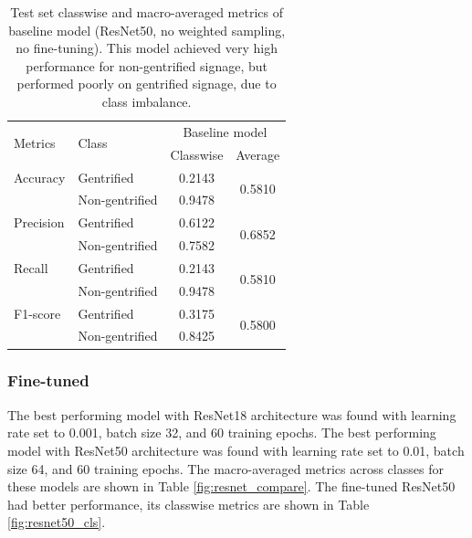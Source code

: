 \begin{table}[h]
\begin{tabular}{llcc}
\toprule
\multirow{2}{*}{Metrics}   & \multirow{2}{*}{Class} & \multicolumn{2}{c}{Baseline model}        \\ \cline{3-4} 
                           &                        & Classwise & Average                 \\ \hline
Accuracy                   & Gentrified             & 0.2143    & \multirow{2}{*}{0.5810} \\
                           & Non-gentrified         & 0.9478    &                         \\
Precision                  & Gentrified             & 0.6122    & \multirow{2}{*}{0.6852} \\
                           & Non-gentrified         & 0.7582    &                         \\
Recall                     & Gentrified             & 0.2143    & \multirow{2}{*}{0.5810} \\
                           & Non-gentrified         & 0.9478    &                         \\
F1-score                   & Gentrified             & 0.3175    & \multirow{2}{*}{0.5800} \\
                           & Non-gentrified         & 0.8425    &                         \\
\bottomrule
\end{tabular}
\caption{Test set classwise and macro-averaged metrics of baseline model (ResNet50, no weighted sampling, no fine-tuning). This model achieved very high performance for non-gentrified signage, but performed poorly on gentrified signage, due to class imbalance.}
\label{fig:baseline_metrics}
\end{table}


\subsubsection{Fine-tuned}
The best performing model with ResNet18 architecture was found with learning rate set to 0.001, batch size 32, and 60 training epochs. The best performing model with ResNet50 architecture was found with learning rate set to 0.01, batch size 64, and 60 training epochs. The macro-averaged metrics across classes for these models are shown in Table \ref{fig:resnet_compare}. The fine-tuned ResNet50 had better performance, its classwise metrics are shown in Table \ref{fig:resnet50_cls}.


